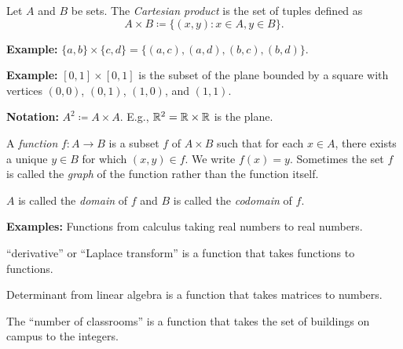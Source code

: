 \documentclass[10pt,aspectratio=169]{beamer}
\begin{document}
\begin{frame}


\begin{definition}
Let $A$ and $B$ be sets.  The \emph{Cartesian product}
is the set of tuples defined as
\begin{equation*}
A \times B \coloneqq
\bigl\{ (x,y) : x \in A, y \in B \bigr\} .
\end{equation*}
\end{definition}

\pause

\textbf{Example:} $\{ a,b \} \times \{ c , d\} = \bigl\{ (a,c), (a,d), (b,c), (b,d) \bigr\}$.

\medskip
\pause

\textbf{Example:} $[0,1] \times [0,1]$ is the subset of
the plane bounded by a square with vertices $(0,0)$, $(0,1)$, $(1,0)$, and $(1,1)$.

\medskip
\pause

\textbf{Notation:} $A^2 \coloneqq A \times A$.  E.g., ${\mathbb{R}}^2 = {\mathbb{R}} \times {\mathbb{R}}$ is the
plane.

\medskip
\pause



\begin{definition}
A \emph{function} $f \colon A \to B$ is a subset $f$ of $A \times B$
such that for each $x \in A$, there exists a unique $y \in B$ for which $(x,y) \in f$.
\pause
We write $f(x) = y$.
\pause
Sometimes
the set $f$ is called the \emph{graph} of the function rather than
the function itself.

\medskip
\pause
$A$ is called the \emph{domain} of $f$ and
$B$ is called the \emph{codomain} of $f$.
\end{definition}

\end{frame}

\begin{frame}

\textbf{Examples:} Functions from calculus taking real numbers
to real numbers.

\pause
\medskip
``derivative'' or ``Laplace transform'' is a function that takes
functions to functions.

\pause
\medskip
Determinant from linear algebra is a function that takes matrices to
numbers.

\pause
\medskip

The ``number of classrooms'' is a function that takes the set of buildings
on campus to the integers.
\end{frame}
\end{document}
